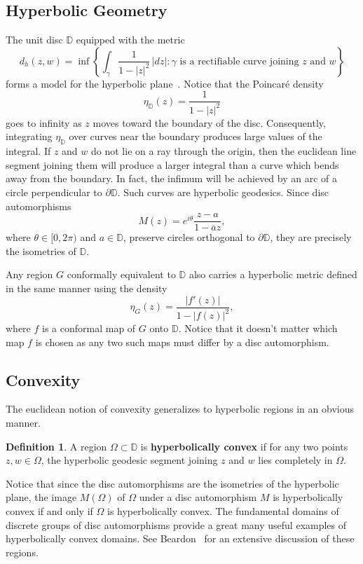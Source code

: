 \documentclass[12pt]{icgft}
\newcommand{\D}{\mathbb D}
\newcommand{\abs}[1]{\lvert#1\rvert}
\theoremstyle{definition}
\newtheorem{definition}[theorem]{Definition}
\numberwithin{equation}{section}
\begin{document}
\subsection{Hyperbolic Geometry}

The unit disc $\D$ equipped with the metric
\[
d_h (z,w)=\inf
\left\{\int_\gamma \frac{1}{1-\abs{z}^2}\,\abs{dz} : \gamma
\text{ is a rectifiable curve joining $z$ and $w$}\right\}
\]
forms a model for the hyperbolic plane~\cite{aB83}.
Notice that the Poincar\'e
density
\[
\eta_\D(z)=\frac{1}{1-\abs{z}^2}
\]
goes to infinity as $z$ moves toward the boundary of the disc.
Consequently, integrating $\eta_\D$ over curves near the boundary
produces large values of the integral.  If $z$ and $w$ do not lie on
a ray through the origin, then the euclidean line segment
joining them will produce a larger integral than a curve which bends
away from the boundary.  In fact, the infimum  will be achieved by
an arc of a circle perpendicular to $\partial \D$.  Such curves are
hyperbolic geodesics.
Since disc automorphisms
\[
M(z)=e^{i\theta}\frac{z-a}{1-\overline{a}z},
\]
where $\theta\in[0,2\pi)$ and $a\in\D$,
preserve circles
orthogonal to $\partial \D$,
they are precisely the isometries of $\D$.

Any region $G$ conformally equivalent to $\D$ also carries a hyperbolic metric
defined in the same manner using  the density
\[
\eta_G(z)=\frac{\abs{f'(z)}}{1-\abs{f(z)}^2},
\]
where $f$ is a conformal map of $G$ onto $\D$.  Notice that it doesn't
matter which map $f$ is chosen as any two such maps must differ by a
disc automorphism.


\subsection{Convexity}

The euclidean notion of convexity generalizes to hyperbolic regions in an
obvious manner.

\begin{definition}A region $\Omega\subset\D$ is \textbf{hyperbolically convex}
if for any two points $z,w\in\Omega$, the hyperbolic  geodesic segment joining
$z$ and $w$ lies completely in $\Omega$.
\end{definition}


Notice that since the disc automorphisms are the isometries
of the hyperbolic plane, the image $M(\Omega)$ of $\Omega$ under a disc
automorphism $M$ is hyperbolically convex if and only if $\Omega$ is hyperbolically convex.
The fundamental domains of discrete groups of disc automorphisms
provide a great many useful examples of hyperbolically convex domains.
See Beardon~\cite{aB83} for an extensive discussion of these regions.
\end{document}
